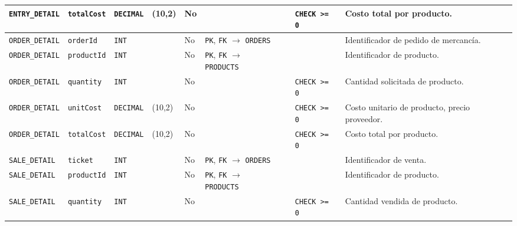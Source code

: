 \documentclass[11pt]{article}
\begin{document}
\begin{landscape}
\begin{xltabular}{\textheight}{
    | p{3.1cm} 
    | p{2.0cm} 
    | p{1.5cm} 
    | p{1.4cm} 
    | p{0.9cm} 
    | p{3.0cm} 
    | p{3.0cm} 
    | p{2.0cm} 
    | p{3.5cm} |
}
    \midrule
    \texttt{ENTRY\_DETAIL}      & \texttt{totalCost}   & \texttt{DECIMAL}   & (10,2)               & No   &                                                                &                   & \texttt{CHECK >= 0}    & Costo total por producto.  \\
    \midrule
    \texttt{ORDER\_DETAIL}      & \texttt{orderId}     & \texttt{INT}       &                      & No   & \texttt{PK}, \texttt{FK} $\longrightarrow$ \texttt{ORDERS}       &                   &               & Identificador de pedido de mercancía.  \\
    \midrule
    \texttt{ORDER\_DETAIL}      & \texttt{productId}   & \texttt{INT}       &                      & No   & \texttt{PK}, \texttt{FK} $\longrightarrow$ \texttt{PRODUCTS}     &                   &               & Identificador de producto. \\           
    \midrule
    \texttt{ORDER\_DETAIL}      & \texttt{quantity}    & \texttt{INT}       &                      & No   &                                                                &                   & \texttt{CHECK >= 0}    & Cantidad solicitada de producto. \\
    \midrule
    \texttt{ORDER\_DETAIL}      & \texttt{unitCost}    & \texttt{DECIMAL}   & (10,2)               & No   &                                                                &                   & \texttt{CHECK >= 0}    & Costo unitario de producto, precio proveedor. \\
    \midrule
    \texttt{ORDER\_DETAIL}      & \texttt{totalCost}   & \texttt{DECIMAL}   & (10,2)               & No   &                                                                &                   & \texttt{CHECK >= 0}    & Costo total por producto. \\                    
    \midrule
    \texttt{SALE\_DETAIL}       & \texttt{ticket}      & \texttt{INT}       &                      & No   & \texttt{PK}, \texttt{FK} $\longrightarrow$ \texttt{ORDERS}       &                   &               & Identificador de venta. \\                  
    \midrule
    \texttt{SALE\_DETAIL}       & \texttt{productId}   & \texttt{INT}       &                      & No   & \texttt{PK}, \texttt{FK} $\longrightarrow$ \texttt{PRODUCTS}     &                   &               & Identificador de producto. \\               
    \midrule
    \texttt{SALE\_DETAIL}       & \texttt{quantity}    & \texttt{INT}       &                      & No   &                                                                &                   & \texttt{CHECK >= 0}    & Cantidad vendida de producto. \\

\end{xltabular}
\end{landscape}
\end{document}
